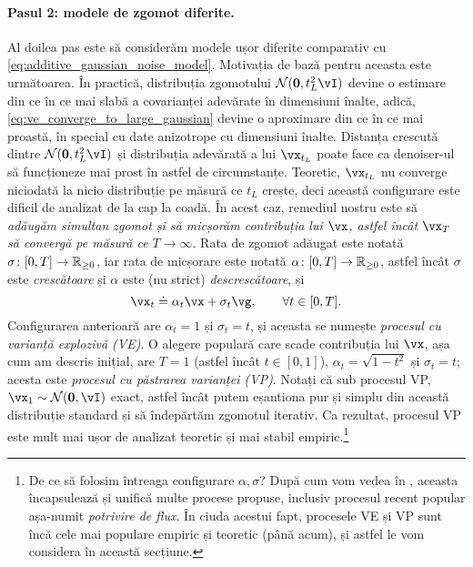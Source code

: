 \documentclass[../../book-main_ro.tex]{subfiles}
\begin{document}
\paragraph{Pasul 2: modele de zgomot diferite.} Al doilea pas este să considerăm modele ușor diferite comparativ cu \eqref{eq:additive_gaussian_noise_model}. Motivația de bază pentru aceasta este următoarea. În practică, distribuția zgomotului \(\dNorm(\vzero, t_{L}^{2}\vI)\) devine o estimare din ce în ce mai slabă a covarianței adevărate în dimensiuni înalte, adică, \eqref{eq:ve_converge_to_large_gaussian} devine o aproximare din ce în ce mai proastă, în special cu date anizotrope cu dimensiuni înalte. Distanța crescută dintre \(\dNorm(\vzero, t_{L}^{2}\vI)\) și distribuția adevărată a lui \(\vx_{t_{L}}\) poate face ca denoiser-ul să funcționeze mai prost în astfel de circumstanțe. Teoretic, \(\vx_{t_{L}}\) nu converge niciodată la nicio distribuție pe măsură ce \(t_{L}\) crește, deci această configurare este dificil de analizat de la cap la coadă. În acest caz, remediul nostru este să \textit{adăugăm simultan zgomot și să micșorăm contribuția lui \(\vx\), astfel încât \(\vx_{T}\) să convergă pe măsură ce \(T \to \infty\)}. Rata de zgomot adăugat este notată \(\sigma \colon [0, T] \to \mathbb{R}_{\geq 0}\), iar rata de micșorare este notată \(\alpha \colon [0, T] \to \mathbb{R}_{\geq 0}\), astfel încât \(\sigma\) este \textit{crescătoare} și \(\alpha\) este (nu strict) \textit{descrescătoare}, și 
\begin{equation}\label{eq:gen_additive_gaussian_noise_model}
	\vx_{t} \doteq \alpha_{t}\vx + \sigma_{t}\vg, \qquad \forall t \in [0, T].
\end{equation}
Configurarea anterioară are \(\alpha_{t} = 1\) și \(\sigma_{t} = t\), și aceasta se numește \textit{procesul cu varianță explozivă (VE)}. O alegere populară care scade contribuția lui \(\vx\), așa cum am descris inițial, are \(T = 1\) (astfel încât \(t \in [0, 1]\)), \(\alpha_{t} = \sqrt{1 - t^{2}}\) și \(\sigma_{t} = t\); acesta este \textit{procesul cu păstrarea varianței (VP)}. Notați că sub procesul VP, \(\vx_{1} \sim \dNorm(\vzero, \vI)\) exact, astfel încât putem eșantiona pur și simplu din această distribuție standard și să îndepărtăm zgomotul iterativ. Ca rezultat, procesul VP este mult mai ușor de analizat teoretic și mai stabil empiric.\footnote{De ce să folosim întreaga configurare \(\alpha, \sigma\)? După cum vom vedea în , aceasta încapsulează și unifică multe procese propuse, inclusiv procesul recent popular așa-numit \textit{potrivire de flux}. În ciuda acestui fapt, procesele VE și VP sunt încă cele mai populare empiric și teoretic (până acum), și astfel le vom considera în această secțiune.} 
\end{document}
